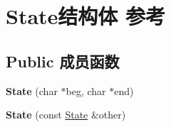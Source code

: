 \hypertarget{struct_state}{}\section{State结构体 参考}
\label{struct_state}
\subsection*{Public 成员函数}
\begin{DoxyCompactItemize}
\item 
\mbox{\label{struct_state_ae9f4b4d244e85da2a1b7866d7972bef3}} 
{\bfseries State} (char $\ast$beg, char $\ast$end)
\item 
\mbox{\label{struct_state_a7325c890ee133fde5ca26eb4cea1f8ce}} 
{\bfseries State} (const \hyperlink{struct_state}{State} \&other)
\end{DoxyCompactItemize}
